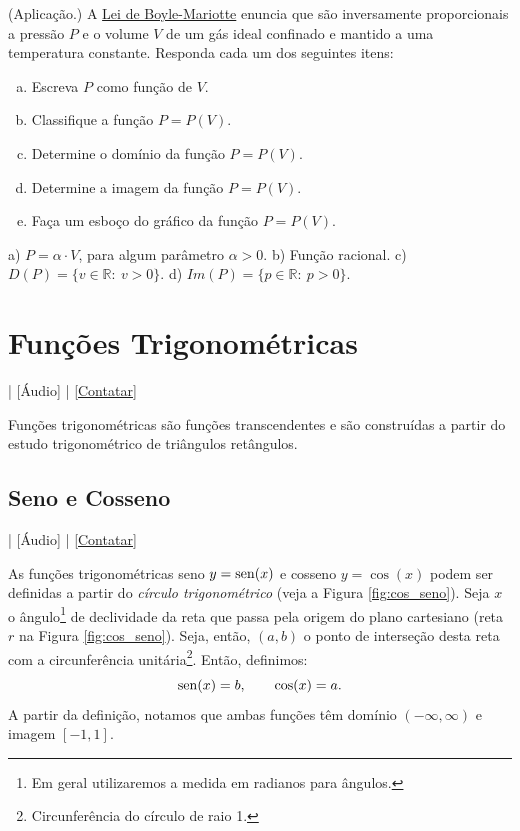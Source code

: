 \begin{exer}(Aplicação.)
  A \href{https://pt.wikipedia.org/wiki/Lei\_de\_Boyle-Mariotte}{Lei de Boyle-Mariotte} enuncia que são inversamente proporcionais a pressão $P$ e o volume $V$ de um gás ideal confinado e mantido a uma temperatura constante. Responda cada um dos seguintes itens:
  \begin{enumerate}[a)]
  \item Escreva $P$ como função de $V$.
  \item Classifique a função $P = P(V)$.
  \item Determine o domínio da função $P = P(V)$.
  \item Determine a imagem da função $P = P(V)$.
  \item Faça um esboço do gráfico da função $P = P(V)$.
  \end{enumerate}
\end{exer}
\begin{resp}
  a) $\displaystyle P = \alpha\cdot V$, para algum parâmetro $\alpha>0$. b) Função racional. c) $D(P) = \{v\in\mathbb{R}:~v>0\}$. d) $Im(P) = \{p\in\mathbb{R}:~p>0\}$. 
\end{resp}


\section{Funções Trigonométricas}\label{cap_funcao_sec_funtri}

\begin{flushright}
  [Vídeo] | [Áudio] | \href{https://phkonzen.github.io/notas/contato.html}{[Contatar]}
\end{flushright}

Funções trigonométricas são funções transcendentes e são construídas a partir do estudo trigonométrico de triângulos retângulos.

\subsection{Seno e Cosseno}

\begin{flushright}
  [Vídeo] | [Áudio] | \href{https://phkonzen.github.io/notas/contato.html}{[Contatar]}
\end{flushright}

As funções trigonométricas seno $y=\operatorname{sen}(x)$ e cosseno $y=\cos(x)$ podem ser definidas a partir do \emph{círculo trigonométrico} (veja a Figura \ref{fig:cos_seno}). Seja $x$ o ângulo\footnote{Em geral utilizaremos a medida em radianos para ângulos.} de declividade da reta que passa pela origem do plano cartesiano (reta $r$ na Figura \ref{fig:cos_seno}). Seja, então, $(a,b)$ o ponto de interseção desta reta com a circunferência unitária\footnote{Circunferência do círculo de raio 1.}. Então, definimos:
\begin{equation}
  \operatorname{sen}(x) = b,\qquad \cos(x) = a.
\end{equation}
A partir da definição, notamos que ambas funções têm domínio $(-\infty, \infty)$ e imagem $[-1, 1]$.

